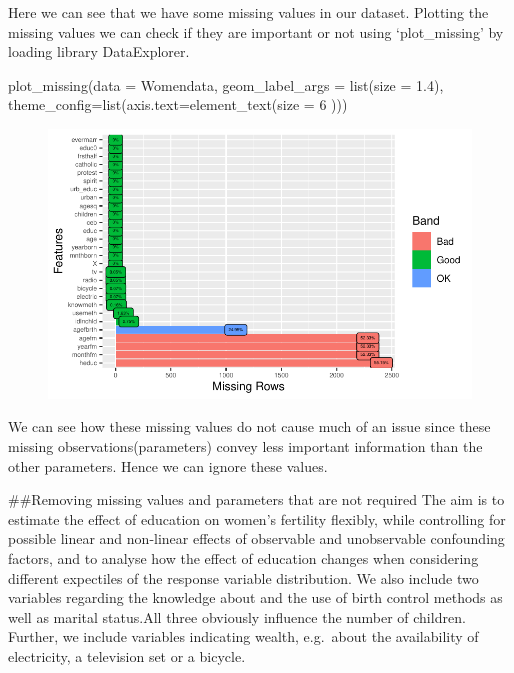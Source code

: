 \documentclass[
  letterpaper,
  DIV=11,
  numbers=noendperiod]{scrartcl}
\newenvironment{Shaded}{\begin{snugshade}}{\end{snugshade}}
\newcommand{\AttributeTok}[1]{\textcolor[rgb]{0.40,0.45,0.13}{#1}}
\newcommand{\DecValTok}[1]{\textcolor[rgb]{0.68,0.00,0.00}{#1}}
\newcommand{\FloatTok}[1]{\textcolor[rgb]{0.68,0.00,0.00}{#1}}
\newcommand{\FunctionTok}[1]{\textcolor[rgb]{0.28,0.35,0.67}{#1}}
\newcommand{\NormalTok}[1]{\textcolor[rgb]{0.00,0.23,0.31}{#1}}
\begin{document}
Here we can see that we have some missing values in our dataset.
Plotting the missing values we can check if they are important or not
using `plot\_missing' by loading library DataExplorer.

\begin{Shaded}
\begin{Highlighting}[]
\FunctionTok{plot\_missing}\NormalTok{(}\AttributeTok{data =}\NormalTok{ Womendata, }\AttributeTok{geom\_label\_args =} \FunctionTok{list}\NormalTok{(}\AttributeTok{size =} \FloatTok{1.4}\NormalTok{), }\AttributeTok{theme\_config=}\FunctionTok{list}\NormalTok{(}\AttributeTok{axis.text=}\FunctionTok{element\_text}\NormalTok{(}\AttributeTok{size =} \DecValTok{6}\NormalTok{ )))}
\end{Highlighting}
\end{Shaded}

\begin{figure}[H]

{\centering \includegraphics{Fertility_Rates_Education_Impact_Botswana_files/figure-pdf/unnamed-chunk-10-1.pdf}

}

\end{figure}

We can see how these missing values do not cause much of an issue since
these missing observations(parameters) convey less important information
than the other parameters. Hence we can ignore these values.

\#\#Removing missing values and parameters that are not required The aim
is to estimate the effect of education on women's fertility flexibly,
while controlling for possible linear and non-linear effects of
observable and unobservable confounding factors, and to analyse how the
effect of education changes when considering different expectiles of the
response variable distribution. We also include two variables regarding
the knowledge about and the use of birth control methods as well as
marital status.All three obviously influence the number of children.
Further, we include variables indicating wealth, e.g.~about the
availability of electricity, a television set or a bicycle.
\end{document}
